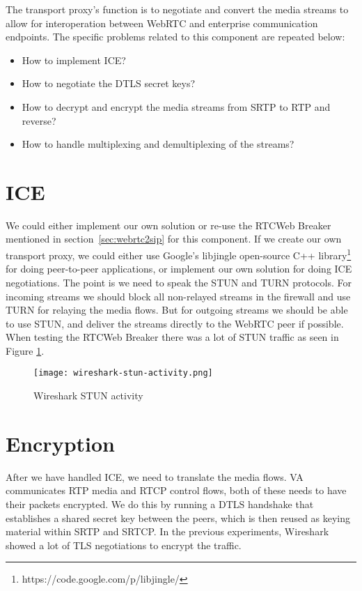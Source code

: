 The transport proxy's function is to negotiate and convert the media streams to allow for interoperation between WebRTC and enterprise communication endpoints. The specific problems related to this component are repeated below:

\begin{itemize}
\item{How to implement ICE?}
\item{How to negotiate the DTLS secret keys?}
\item{How to decrypt and encrypt the media streams from SRTP to RTP and reverse?}
\item{How to handle multiplexing and demultiplexing of the streams?}
\end{itemize}


\section{ICE}
We could either implement our own solution or re-use the RTCWeb Breaker mentioned in section~\ref{sec:webrtc2sip} for this component. If we create our own transport proxy, we could either use Google's libjingle open-source C++ library\footnote{https://code.google.com/p/libjingle/} for doing peer-to-peer applications, or implement our own solution for doing ICE negotiations. The point is we need to speak the STUN and TURN protocols. For incoming streams we should block all non-relayed streams in the firewall and use TURN for relaying the media flows. But for outgoing streams we should be able to use STUN, and deliver the streams directly to the WebRTC peer if possible. When testing the RTCWeb Breaker there was a lot of STUN traffic as seen in Figure \ref{fig:wireshark-stun-activity}.

\begin{figure}[here]
\centerline{\texttt{[image: wireshark-stun-activity.png]}}
\caption{Wireshark STUN activity}
\label{fig:wireshark-stun-activity}
\end{figure}

\section{Encryption}
After we have handled ICE, we need to translate the media flows. VA communicates RTP media and RTCP control flows, both of these needs to have their packets encrypted. We do this by running a DTLS handshake that establishes a shared secret key between the peers, which is then reused as keying material within SRTP and SRTCP. In the previous experiments, Wireshark showed a lot of TLS negotiations to encrypt the traffic.


